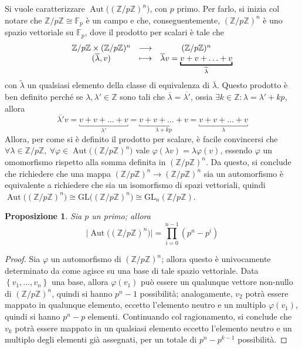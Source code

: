 \documentclass[12pt]{scrartcl}
\theoremstyle{style}
\newtheorem{prop}{Proposizione}[section]
\numberwithin{equation}{subsection}
\begin{document}
Si vuole caratterizzare $\operatorname{Aut} \big((\mathbb{Z}/p\mathbb{Z})^n\big)$, con $p$ primo.
Per farlo, si inizia col notare che $\mathbb{Z}/p\mathbb{Z} \cong \mathbb{F}_p$ \`e un campo e che, conseguentemente, $(\mathbb{Z}/p\mathbb{Z})^n$ \`e uno spazio vettoriale su $\mathbb{F}_p$, dove il prodotto per scalari \`e tale che
\[
\begin{array}
	{c c c} 
	\mathbb{Z}/p\mathbb{Z}\times (\mathbb{Z}/p\mathbb{Z})^n &\longrightarrow & (\mathbb{Z}/p\mathbb{Z})^n\\
	(\overline{\lambda },v) &\longmapsto & \overline{\lambda }v = \underbracket{v + v+ \ldots+v}_{\widetilde{\lambda }} 
\end{array}
\] 
con $\widetilde{\lambda }$ un qualsiasi elemento della classe di equivalenza di $\overline{\lambda }$.
Questo prodotto \`e ben definito perch\'e se $\lambda , \lambda ' \in \mathbb{Z}$ sono tali che $\overline{\lambda } = \overline{\lambda '}$, ossia $\exists k \in \mathbb{Z} : \lambda  = \lambda ' + kp$, allora
\[
\overline{\lambda '} v = \underbracket{v + v+ \ldots+v}_{\lambda '}= \underbracket{v + v+ \ldots+v}_{\lambda +kp} = \underbracket{v + v+ \ldots+v}_{\lambda}
\] 
Allora, per come si \`e definito il prodotto per scalare, \`e facile convincersi che $\forall \lambda \in \mathbb{Z}/p\mathbb{Z},\ \forall \varphi \in \operatorname{Aut} \big((\mathbb{Z}/p\mathbb{Z})^n\big)$ vale $\varphi (\lambda v) = \lambda \varphi (v)$, essendo $\varphi $ un omomorfismo rispetto alla somma definita in $(\mathbb{Z}/p\mathbb{Z})^n$. 
Da questo, si conclude che richiedere che una mappa $(\mathbb{Z}/p\mathbb{Z})^n \to (\mathbb{Z}/p\mathbb{Z})^n$ sia un automorfismo \`e equivalente a richiedere che sia un isomorfismo di spazi vettoriali, quindi $\operatorname{Aut} \big((\mathbb{Z}/p\mathbb{Z})^n\big) \cong \mathrm{GL} \big((\mathbb{Z}/p\mathbb{Z})^n\big)\cong \mathrm{GL} _n (\mathbb{Z}/p\mathbb{Z})$.
\begin{prop}
	Sia $p$ un primo; allora
	\[
	\big\lvert \operatorname{Aut} \big((\mathbb{Z}/p\mathbb{Z})^n\big) \big\rvert = \prod_{i=0} ^{n-1} (p^n- p^i)
	\] 
\end{prop}
	\begin{proof}
		Sia $\varphi $ un automorfismo di $(\mathbb{Z}/p\mathbb{Z})^n$; allora questo \`e univocamente determinato da come agisce su una base di tale spazio vettoriale. 
		Data $\left\{ v_1,\ldots,v_n \right\} $ una base, allora $\varphi (v_1)$ pu\`o essere un qualunque vettore non-nullo di $(\mathbb{Z}/p\mathbb{Z})^n$, quindi si hanno $p^n-1$ possibilit\`a; analogamente, $v_2$ potr\`a essere mappato in qualunque elemento, eccetto l'elemento neutro e un multiplo $\varphi (v_1)$, quindi si hanno $p^n-p $ elementi. 
		Continuando col ragionamento, si conclude che $v_k$ potr\`a essere mappato in un qualsiasi elemento eccetto l'elemento neutro e un multiplo degli elementi gi\`a assegnati, per un totale di $p^n - p^{k-1} $ possibilit\`a.
	\end{proof}
\end{document}
